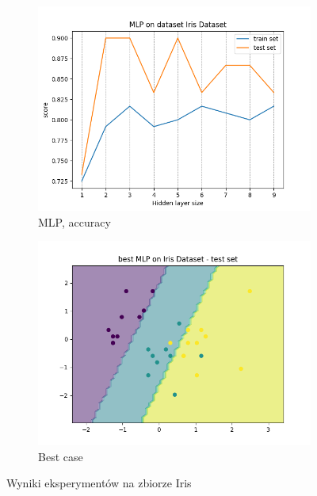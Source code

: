 \documentclass[12pt]{article}
\newcommand*{\subfigwidth}{0.24\textwidth}
\begin{document}
\begin{figure}[H]
\begin{subfigure}[t]{\subfigwidth}
        \includegraphics[width=\linewidth]{img/other_datasets/mlp/iris_accuracy.png}
        \caption{MLP, accuracy}
    \end{subfigure}
    \hfill
    \begin{subfigure}[t]{\subfigwidth}
        \includegraphics[width=\linewidth]{img/other_datasets/mlp/iris_best_boundary_test.png}
        \caption{Best case}
    \end{subfigure}
    \caption{Wyniki eksperymentów na zbiorze Iris}
\end{figure}
\end{document}
